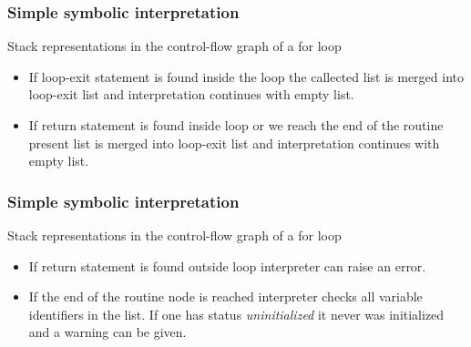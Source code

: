 \documentclass[presentation]{beamer}
\begin{document}
\begin{frame}
  \frametitle{Simple symbolic interpretation}
  
  \begin{block}{Stack representations in the control-flow graph of a for loop}
  \begin{itemize}
      \item If loop-exit statement is found inside the loop the callected list is merged into loop-exit list and interpretation continues with empty list.\\
      \item If return statement is found inside loop or we reach the end of the routine present list is merged into loop-exit list and interpretation continues with empty list.
  \end{itemize}
  \end{block}
  
\end{frame}

\begin{frame}
  \frametitle{Simple symbolic interpretation}
  \begin{block}{Stack representations in the control-flow graph of a for loop}
  \begin{itemize}
      \item If return statement is found outside loop interpreter can raise an error.
      \item If the end of the routine node is reached interpreter checks all variable identifiers in the list. If one has status \emph{uninitialized} it never was initialized and a warning can be given.
  \end{itemize}
  \end{block}
  
\end{frame}
\end{document}
